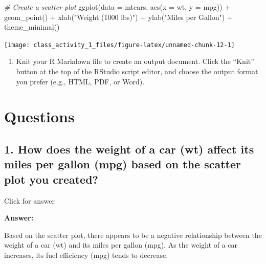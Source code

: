 \documentclass[
]{book}
\newenvironment{Shaded}{\begin{snugshade}}{\end{snugshade}}
\newcommand{\AttributeTok}[1]{\textcolor[rgb]{0.77,0.63,0.00}{#1}}
\newcommand{\CommentTok}[1]{\textcolor[rgb]{0.56,0.35,0.01}{\textit{#1}}}
\newcommand{\FunctionTok}[1]{\textcolor[rgb]{0.00,0.00,0.00}{#1}}
\newcommand{\NormalTok}[1]{#1}
\newcommand{\SpecialCharTok}[1]{\textcolor[rgb]{0.00,0.00,0.00}{#1}}
\newcommand{\StringTok}[1]{\textcolor[rgb]{0.31,0.60,0.02}{#1}}
\providecommand{\tightlist}{%
  \setlength{\itemsep}{0pt}\setlength{\parskip}{0pt}}
\begin{document}
\begin{Shaded}
\begin{Highlighting}[]
\CommentTok{\# Create a scatter plot}
\FunctionTok{ggplot}\NormalTok{(}\AttributeTok{data =}\NormalTok{ mtcars, }\FunctionTok{aes}\NormalTok{(}\AttributeTok{x =}\NormalTok{ wt, }\AttributeTok{y =}\NormalTok{ mpg)) }\SpecialCharTok{+}
  \FunctionTok{geom\_point}\NormalTok{() }\SpecialCharTok{+}
  \FunctionTok{xlab}\NormalTok{(}\StringTok{"Weight (1000 lbs)"}\NormalTok{) }\SpecialCharTok{+}
  \FunctionTok{ylab}\NormalTok{(}\StringTok{"Miles per Gallon"}\NormalTok{) }\SpecialCharTok{+}
  \FunctionTok{theme\_minimal}\NormalTok{()}
\end{Highlighting}
\end{Shaded}

\texttt{[image: class\_activity\_1\_files/figure-latex/unnamed-chunk-12-1]}

\begin{enumerate}
\def\labelenumi{\arabic{enumi}.}
\setcounter{enumi}{2}
\tightlist
\item
  Knit your R Markdown file to create an output document. Click the ``Knit'' button at the top of the RStudio script editor, and choose the output format you prefer (e.g., HTML, PDF, or Word).
\end{enumerate}

\vspace*{0.5in}

\hypertarget{questions}{%
\section{Questions}\label{questions}}

\hypertarget{how-does-the-weight-of-a-car-wt-affect-its-miles-per-gallon-mpg-based-on-the-scatter-plot-you-created}{%
\subsection{1. How does the weight of a car (wt) affect its miles per gallon (mpg) based on the scatter plot you created?}\label{how-does-the-weight-of-a-car-wt-affect-its-miles-per-gallon-mpg-based-on-the-scatter-plot-you-created}}

Click for answer

\textbf{Answer:}

Based on the scatter plot, there appears to be a negative relationship between the weight of a car (wt) and its miles per gallon (mpg). As the weight of a car increases, its fuel efficiency (mpg) tends to decrease.
\end{document}
